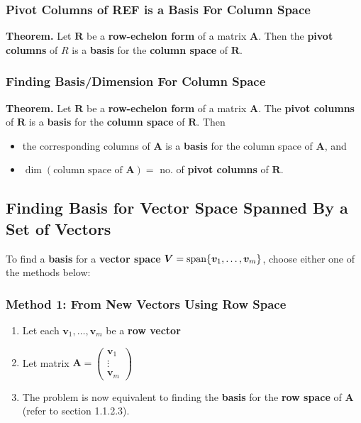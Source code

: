 \documentclass[../ma2001_notes.tex]{subfiles}
\begin{document}
\subsubsection{Pivot Columns of REF is a Basis For Column Space}
\textbf{Theorem.} Let \(\bm{R}\) be a \textbf{row-echelon form} of a matrix \(\bm{A}\). Then the \textbf{pivot columns} of \(R\) is a \textbf{basis} for the \textbf{column space} of \(\bm{R}\).

\subsubsection{Finding Basis/Dimension For Column Space}
\textbf{Theorem.} Let \(\bm{R}\) be a \textbf{row-echelon form} of a matrix \(\bm{A}\). The \textbf{pivot columns} of \(\bm{R}\) is a \textbf{basis} for the \textbf{column space} of \(\bm{R}\). Then
\begin{itemize}
	\item the corresponding columns of \(\bm{A}\) is a \textbf{basis} for the column space of \(\bm{A}\), and
	\item\(\dim(\text{column space of }\bm{A})=\) no. of \textbf{pivot columns} of \(\bm{R}\).
\end{itemize}

\subsection{Finding Basis for Vector Space Spanned By a Set of Vectors}
To find a \textbf{basis} for a \textbf{vector space} \(\bm{V}=\operatorname{span}\{\bm{v}_1,\ldots,\bm{v}_m\}\), choose either one of the methods below:

\subsubsection{Method 1: From New Vectors Using Row Space}
\begin{enumerate}
	\item Let each \(\bm{v}_1,\ldots,\bm{v}_m\) be a \textbf{row vector}
	\item Let matrix \(\bm{A}=\begin{pmatrix}
		\bm{v}_1 \\ \vdots \\ \bm{v}_m
	\end{pmatrix}\)
	\item The problem is now equivalent to finding the \textbf{basis} for the \textbf{row space} of \(\bm{A}\) (refer to section 1.1.2.3).
\end{enumerate}
\end{document}
